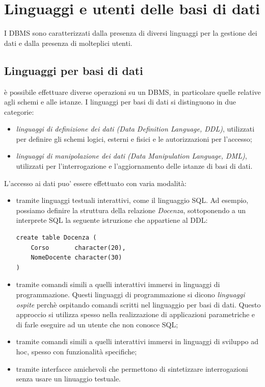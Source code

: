 \documentclass[12pt]{report}
\begin{document}
			\section{Linguaggi e utenti delle basi di dati}
			I DBMS sono caratterizzati dalla presenza di diversi linguaggi per la gestione dei dati e dalla presenza di molteplici utenti.
			\subsection{Linguaggi per basi di dati}
			è possibile effettuare diverse operazioni su un DBMS, in particolare quelle relative agli schemi e alle istanze. I linguaggi per basi di dati si distinguono in due categorie:
			\begin{itemize}
				\item \textit{linguaggi di definizione dei dati (Data Definition Language, DDL)}, utilizzati per definire gli schemi logici, esterni e fisici e le autorizzazioni per l'accesso;
				\item \textit{linguaggi di manipolazione dei dati (Data Manipulation Language, DML)}, utilizzati per l'interrogazione e l'aggiornamento delle istanze di basi di dati.
			\end{itemize}
			L'accesso ai dati puo' essere effettuato con varia modalità:
			\begin{itemize}
				\item tramite linguaggi testuali interattivi, come il linguaggio SQL. Ad esempio, possiamo definire la struttura della relazione \textit{Docenza}, sottoponendo a un interprete SQL la seguente istruzione che appartiene al DDL:
				\begin{lstlisting}
create table Docenza (
	Corso	    character(20),
	NomeDocente character(30)
)
				\end{lstlisting}
				\item tramite comandi simili a quelli interattivi immersi in linguaggi di programmazione. Questi linguaggi di programmazione si dicono \textit{linguaggi ospite} perchè ospitando comandi scritti nel linguaggio per basi di dati. Questo approccio si utilizza spesso nella realizzazione di applicazioni parametriche e di farle eseguire ad un utente che non conosce SQL;
				\item tramite comandi simili a quelli interattivi immersi in linguaggi di sviluppo ad hoc, spesso con funzionalità specifiche;
				\item tramite interfacce amichevoli che permettono di sintetizzare interrogazioni senza usare un linuaggio testuale.
			\end{itemize}
\end{document}
